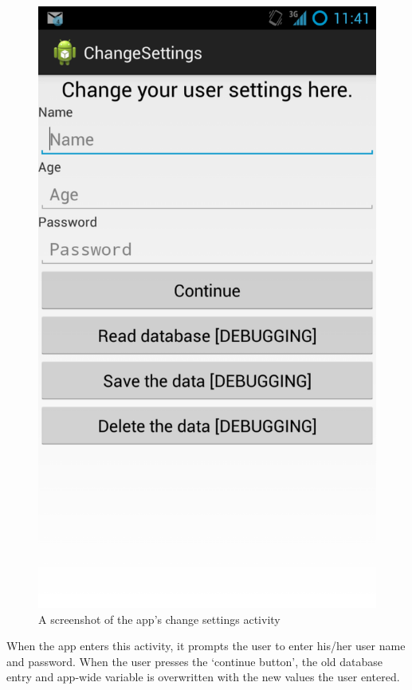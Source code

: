 \begin{figure}[h]
 \centering 
 \includegraphics[clip = true, trim = 0 320 0 60,
 scale=0.2]{change_settings}
 \caption{A screenshot of the app's change settings activity}
 \label{fig:change-settings-screenshot}
\end{figure}

When the app enters this activity, it prompts the user to enter his/her user
name and password. When the user presses the `continue button', the old database
entry and app-wide variable is overwritten with the new values the user entered.

